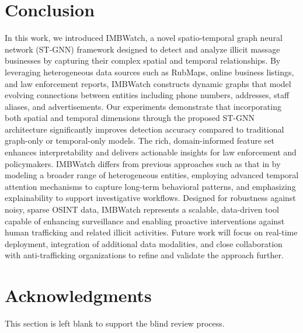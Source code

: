 \documentclass[letterpaper]{article} %
\begin{document}
\section{Conclusion}
In this work, we introduced IMBWatch, a novel spatio-temporal graph neural network (ST-GNN) framework designed to detect and analyze illicit massage businesses by capturing their complex spatial and temporal relationships. By leveraging heterogeneous data sources such as RubMaps, online business listings, and law enforcement reports, IMBWatch constructs dynamic graphs that model evolving connections between entities including phone numbers, addresses, staff aliases, and advertisements. Our experiments demonstrate that incorporating both spatial and temporal dimensions through the proposed ST-GNN architecture significantly improves detection accuracy compared to traditional graph-only or temporal-only models. The rich, domain-informed feature set enhances interpretability and delivers actionable insights for law enforcement and policymakers. IMBWatch differs from previous approaches such as that in \cite{Kong2024-tz} by modeling a broader range of heterogeneous entities, employing advanced temporal attention mechanisms to capture long-term behavioral patterns, and emphasizing explainability to support investigative workflows. Designed for robustness against noisy, sparse OSINT data, IMBWatch represents a scalable, data-driven tool capable of enhancing surveillance and enabling proactive interventions against human trafficking and related illicit activities. Future work will focus on real-time deployment, integration of additional data modalities, and close collaboration with anti-trafficking organizations to refine and validate the approach further.


\section{Acknowledgments}
This section is left blank to support the blind review process. 

\newpage

\end{document}
